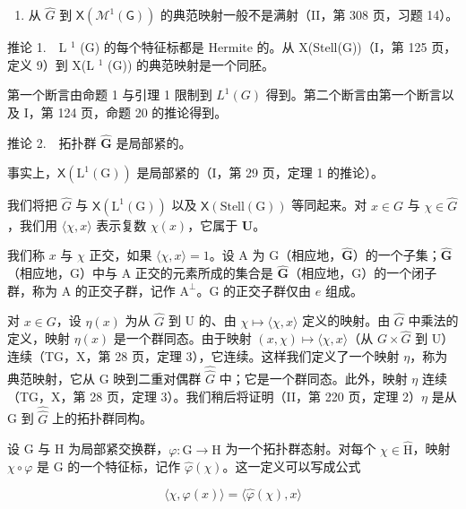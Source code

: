 \begin{enumerate}
\def\labelenumi{\arabic{enumi})}
\setcounter{enumi}{1}
\tightlist
\item
  从 \(\widehat{G}\) 到 \(\mathsf{X}(\mathcal{M}^{1}(\mathsf{G}))\) 的典范映射一般不是满射（II，第 308 页，习题 14）。
\end{enumerate}

推论 1.　L \(^{1}\) (G) 的每个特征标都是 Hermite 的。从 X(Stell(G))（I，第 125 页，定义 9）到 X(L \(^{1}\) (G)) 的典范映射是一个同胚。

第一个断言由命题 1 与引理 1 限制到 \(L^{1}(G)\) 得到。第二个断言由第一个断言以及 I，第 124 页，命题 20 的推论得到。

推论 2.　拓扑群 \(\widehat{\mathbf{G}}\) 是局部紧的。

事实上，\(\mathsf{X}(\mathrm{L}^{1}(\mathrm{G}))\) 是局部紧的（I，第 29 页，定理 1 的推论）。

我们将把 \(\widehat{G}\) 与 \(\mathsf{X}(\mathrm{L}^1 (\mathrm{G}))\) 以及 \(\mathsf{X}(\mathrm{Stell}(\mathrm{G}))\) 等同起来。对 \(x\in G\) 与 \(\chi \in \widehat{G}\)，我们用 \(\langle \chi ,x\rangle\) 表示复数 \(\chi (x)\)，它属于 \(\mathbf{U}\)。

我们称 \(x\) 与 \(\chi\) 正交，如果 \(\langle \chi, x \rangle = 1\)。设 A 为 G（相应地，\(\widehat{\mathbf{G}}\)）的一个子集；\(\widehat{\mathbf{G}}\)（相应地，G）中与 A 正交的元素所成的集合是 \(\widehat{\mathbf{G}}\)（相应地，G）的一个闭子群，称为 A 的正交子群，记作 \(\mathrm{A}^{\perp}\)。G 的正交子群仅由 \(e\) 组成。

对 \(x \in G\)，设 \(\eta(x)\) 为从 \(\widehat{G}\) 到 U 的、由 \(\chi \mapsto \langle \chi, x \rangle\) 定义的映射。由 \(\widehat{G}\) 中乘法的定义，映射 \(\eta(x)\) 是一个群同态。由于映射 \((x, \chi) \mapsto \langle \chi, x \rangle\)（从 \(G \times \widehat{G}\) 到 U）连续（TG，X，第 28 页，定理 3），它连续。这样我们定义了一个映射 \(\eta\)，称为典范映射，它从 G 映到二重对偶群 \(\widehat{\widehat{G}}\) 中；它是一个群同态。此外，映射 \(\eta\) 连续（TG，X，第 28 页，定理 3）。我们稍后将证明（II，第 220 页，定理 2）\(\eta\) 是从 G 到 \(\widehat{\widehat{G}}\) 上的拓扑群同构。

设 G 与 H 为局部紧交换群，\(\varphi\colon\mathrm{G}\to\mathrm{H}\) 为一个拓扑群态射。对每个 \(\chi\in\widehat{\mathrm{H}}\)，映射 \(\chi\circ\varphi\) 是 G 的一个特征标，记作 \(\widehat{\varphi}(\chi)\)。这一定义可以写成公式

\[
\langle \chi , \varphi (x) \rangle = \langle \widehat {\varphi} (\chi), x \rangle\tag{4}
\]

